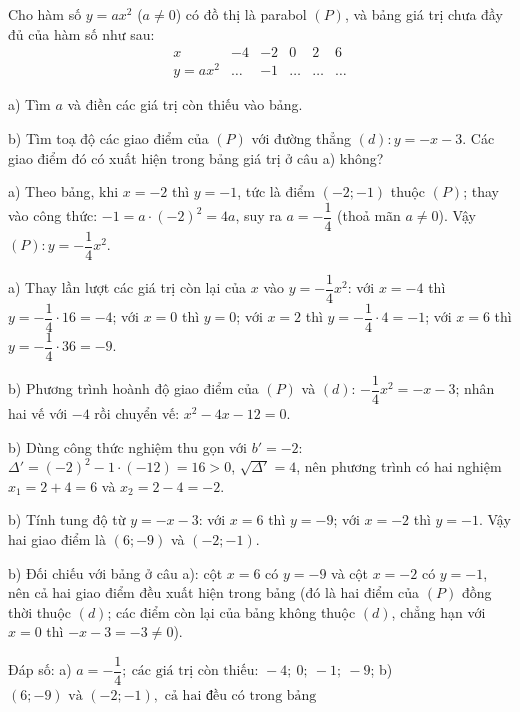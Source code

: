 \begin{problem}[9DS-HSB2-023]
Cho hàm số $y = ax^2$ ($a \neq 0$) có đồ thị là parabol $(P)$, và bảng giá trị chưa đầy đủ của hàm số như sau:
\[
\begin{array}{c|c|c|c|c|c}
x & -4 & -2 & 0 & 2 & 6 \\ \hline
y = ax^2 & \ldots & -1 & \ldots & \ldots & \ldots
\end{array}
\]

a) Tìm $a$ và điền các giá trị còn thiếu vào bảng.

b) Tìm toạ độ các giao điểm của $(P)$ với đường thẳng $(d)\colon y = -x - 3$. Các giao điểm đó có xuất hiện trong bảng giá trị ở câu a) không?

\begin{solution}
a) Theo bảng, khi $x = -2$ thì $y = -1$, tức là điểm $(-2; -1)$ thuộc $(P)$; thay vào công thức: $-1 = a \cdot (-2)^2 = 4a$, suy ra $a = -\dfrac{1}{4}$ (thoả mãn $a \neq 0$). Vậy $(P)\colon y = -\dfrac{1}{4}x^2$.

a) Thay lần lượt các giá trị còn lại của $x$ vào $y = -\dfrac{1}{4}x^2$: với $x = -4$ thì $y = -\dfrac{1}{4} \cdot 16 = -4$; với $x = 0$ thì $y = 0$; với $x = 2$ thì $y = -\dfrac{1}{4} \cdot 4 = -1$; với $x = 6$ thì $y = -\dfrac{1}{4} \cdot 36 = -9$.

b) Phương trình hoành độ giao điểm của $(P)$ và $(d)$: $-\dfrac{1}{4}x^2 = -x - 3$; nhân hai vế với $-4$ rồi chuyển vế: $x^2 - 4x - 12 = 0$.

b) Dùng công thức nghiệm thu gọn với $b' = -2$: $\Delta' = (-2)^2 - 1 \cdot (-12) = 16 > 0$, $\sqrt{\Delta'} = 4$, nên phương trình có hai nghiệm $x_1 = 2 + 4 = 6$ và $x_2 = 2 - 4 = -2$.

b) Tính tung độ từ $y = -x - 3$: với $x = 6$ thì $y = -9$; với $x = -2$ thì $y = -1$. Vậy hai giao điểm là $(6; -9)$ và $(-2; -1)$.

b) Đối chiếu với bảng ở câu a): cột $x = 6$ có $y = -9$ và cột $x = -2$ có $y = -1$, nên cả hai giao điểm đều xuất hiện trong bảng (đó là hai điểm của $(P)$ đồng thời thuộc $(d)$; các điểm còn lại của bảng không thuộc $(d)$, chẳng hạn với $x = 0$ thì $-x - 3 = -3 \neq 0$).

Đáp số: a) $\boxed{a = -\dfrac{1}{4};\ \text{các giá trị còn thiếu: } -4;\ 0;\ -1;\ -9}$; b) $\boxed{(6; -9) \text{ và } (-2; -1), \text{ cả hai đều có trong bảng}}$
\end{solution}
\end{problem}

